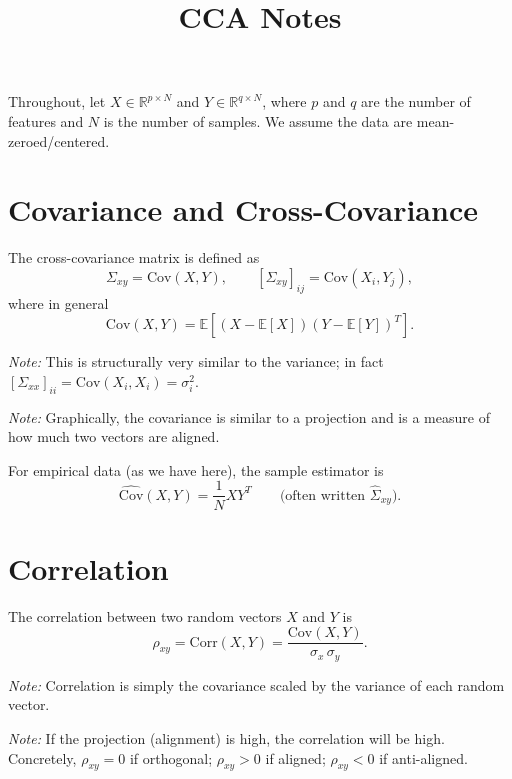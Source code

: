 \documentclass[11pt]{article}
\title{CCA Notes}
\date{}
\begin{document}
\maketitle

Throughout, let $X \in \mathbb{R}^{p \times N}$ and $Y \in \mathbb{R}^{q \times N}$, where $p$ and $q$ are the number of features and $N$ is the number of samples. We assume the data are mean-zeroed/centered.

\section{Covariance and Cross-Covariance}

The cross-covariance matrix is defined as
\[
    \Sigma_{xy} = \mathrm{Cov}(X, Y), \qquad
    \left[\Sigma_{xy}\right]_{ij} = \mathrm{Cov}(X_i, Y_j),
\]
where in general
\[
    \mathrm{Cov}(X, Y) = \mathbb{E}\!\left[(X - \mathbb{E}[X])(Y - \mathbb{E}[Y])^T\right].
\]

\textit{Note:} This is structurally very similar to the variance; in fact $\left[\Sigma_{xx}\right]_{ii} = \mathrm{Cov}(X_i, X_i) = \sigma_i^2$.

\textit{Note:} Graphically, the covariance is similar to a projection and is a measure of how much two vectors are aligned.

For empirical data (as we have here), the sample estimator is
\begin{equation}\label{eq:sample_cov}
    \widehat{\mathrm{Cov}}(X, Y) = \frac{1}{N} X Y^T
    \qquad \text{(often written } \widehat{\Sigma}_{xy}\text{)}.
\end{equation}

\section{Correlation}

The correlation between two random vectors $X$ and $Y$ is
\[
    \rho_{xy} = \mathrm{Corr}(X, Y) = \frac{\mathrm{Cov}(X,Y)}{\sigma_x \, \sigma_y}.
\]

\textit{Note:} Correlation is simply the covariance scaled by the variance of each random vector.

\textit{Note:} If the projection (alignment) is high, the correlation will be high. Concretely, $\rho_{xy} = 0$ if orthogonal; $\rho_{xy} > 0$ if aligned; $\rho_{xy} < 0$ if anti-aligned.
\end{document}
